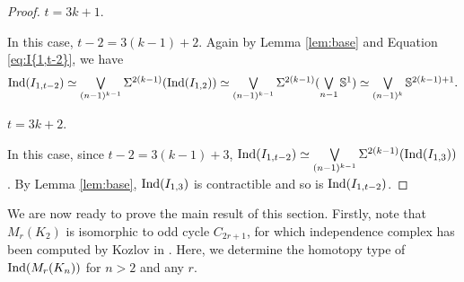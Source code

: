 \documentclass[12pt]{article}
\numberwithin{thm}{section}
\theoremstyle{definition}
\newcommand{\bS}{\mathbb{S}}
\newcommand{\ind}{{\rm{Ind}}}
\begin{document}
\begin{proof}
 $t = 3k+1$.

	In this case, $t-2= 3(k-1)+2$. Again by Lemma \ref{lem:base} and Equation \eqref{eq:I{1,t-2}}, we have 
$$\textstyle \ind(I_{1,t-2}) \simeq \bigvee\limits_{(n-1)^{k-1}} \Sigma^{2(k-1)} (\ind(I_{1,2}) )\simeq \bigvee\limits_{(n-1)^{k-1}} \Sigma^{2(k-1)} (\bigvee\limits_{n-1} \bS^{1}) \simeq \bigvee\limits_{(n-1)^{k}} \bS^{2(k-1)+1}.
$$

 $t = 3k+2$.

In this case, since $t-2= 3(k-1)+3$, 
$\ind(I_{1,t-2}) \simeq \bigvee\limits_{(n-1)^{k-1}} \Sigma^{2(k-1)} (\ind(I_{1,3}) )$. By Lemma \ref{lem:base}, $\ind(I_{1,3})$ is contractible and so is  $\ind(I_{1,t-2})$.
\end{proof}

We are now ready to prove the main result of this section. Firstly, note that $M_r(K_2)$ is isomorphic to odd cycle $C_{2r+1}$, for which independence complex has been computed by Kozlov in \cite{koz}. Here, we determine the homotopy type of $\ind(M_r(K_n))$ for $n > 2$ and any $r$.
\end{document}
